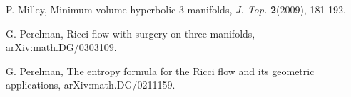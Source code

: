 \begin{thebibliography}{GHMTY}
 P. Milley, Minimum volume hyperbolic 3-manifolds, \textit {J. Top.} \textbf {2}(2009), 181-192.


 G. Perelman, Ricci flow with surgery on three-manifolds, arXiv:math.DG/0303109.

 G. Perelman, The entropy formula for the Ricci flow and its geometric applications, arXiv:math.DG/0211159.

% 


\end{thebibliography}

 
